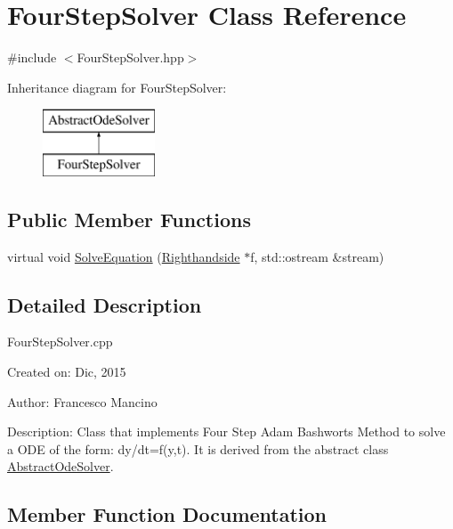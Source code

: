 \hypertarget{class_four_step_solver}{}\section{Four\+Step\+Solver Class Reference}
\label{class_four_step_solver}


{\ttfamily \#include $<$Four\+Step\+Solver.\+hpp$>$}

Inheritance diagram for Four\+Step\+Solver\+:\begin{figure}[H]
\begin{center}
\leavevmode
\includegraphics[height=2.000000cm]{class_four_step_solver}
\end{center}
\end{figure}
\subsection*{Public Member Functions}
\begin{DoxyCompactItemize}
\item 
virtual void \hyperlink{class_four_step_solver_a78b7b6af19731e904c4cdd31b5641aa2}{Solve\+Equation} (\hyperlink{class_righthandside}{Righthandside} $\ast$f, std\+::ostream \&stream)
\end{DoxyCompactItemize}


\subsection{Detailed Description}
Four\+Step\+Solver.\+cpp

Created on\+: Dic, 2015 \begin{DoxyVerb}Author: Francesco Mancino
\end{DoxyVerb}


Description\+: Class that implements Four Step Adam Bashworts Method to solve a O\+D\+E of the form\+: dy/dt=f(y,t). It is derived from the abstract class \hyperlink{class_abstract_ode_solver}{Abstract\+Ode\+Solver}. 

\subsection{Member Function Documentation}
\hypertarget{class_four_step_solver_a78b7b6af19731e904c4cdd31b5641aa2}{}
